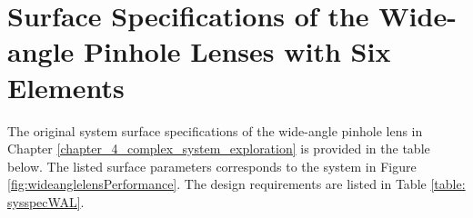 \newpage
\section{Surface Specifications of the Wide-angle Pinhole Lenses with Six Elements} 
\label{apdx: wide-angle-specs_6_elements}

The original system surface specifications of the wide-angle pinhole lens in Chapter \ref{chapter_4_complex_system_exploration} is provided in the table below. The listed surface parameters corresponds to the system in Figure \ref{fig:wideanglelensPerformance}. The design requirements are listed in Table \ref{table: sysspecWAL}.

\setlength{\arrayrulewidth}{.5mm}
\setlength{\tabcolsep}{18pt}
\renewcommand{\arraystretch}{1.2}
